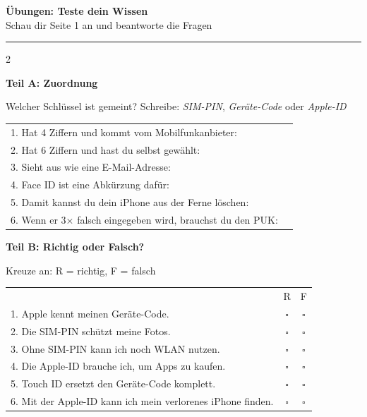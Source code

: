 \documentclass[a4paper,landscape,11pt]{article}
\begin{document}
\newpage


\begin{center}
{\LARGE\bfseries Übungen: Teste dein Wissen}\\[3pt]
{\normalsize Schau dir Seite 1 an und beantworte die Fragen}
\end{center}

\vspace{3mm}
\hrule
\vspace{4mm}

\begin{multicols}{2}

\textbf{\large Teil A: Zuordnung}

Welcher Schlüssel ist gemeint? Schreibe: \textit{SIM-PIN}, \textit{Geräte-Code} oder \textit{Apple-ID}

\vspace{2mm}

\renewcommand{\arraystretch}{1.8}
\begin{tabular}{@{}p{10.5cm}p{3.5cm}@{}}
1. Hat 4 Ziffern und kommt vom Mobilfunkanbieter: & \dotfill \\
2. Hat 6 Ziffern und hast du selbst gewählt: & \dotfill \\
3. Sieht aus wie eine E-Mail-Adresse: & \dotfill \\
4. Face ID ist eine Abkürzung dafür: & \dotfill \\
5. Damit kannst du dein iPhone aus der Ferne löschen: & \dotfill \\
6. Wenn er 3× falsch eingegeben wird, brauchst du den PUK: & \dotfill \\
\end{tabular}
\renewcommand{\arraystretch}{1}

\vspace{6mm}

\textbf{\large Teil B: Richtig oder Falsch?}

Kreuze an: R = richtig, F = falsch

\vspace{2mm}

\renewcommand{\arraystretch}{1.6}
\begin{tabular}{@{}p{10cm}cc@{}}
& R & F \\
1. Apple kennt meinen Geräte-Code. & $\square$ & $\square$ \\
2. Die SIM-PIN schützt meine Fotos. & $\square$ & $\square$ \\
3. Ohne SIM-PIN kann ich noch WLAN nutzen. & $\square$ & $\square$ \\
4. Die Apple-ID brauche ich, um Apps zu kaufen. & $\square$ & $\square$ \\
5. Touch ID ersetzt den Geräte-Code komplett. & $\square$ & $\square$ \\
6. Mit der Apple-ID kann ich mein verlorenes iPhone finden. & $\square$ & $\square$ \\
\end{tabular}
\renewcommand{\arraystretch}{1}


\end{multicols}
\end{document}
